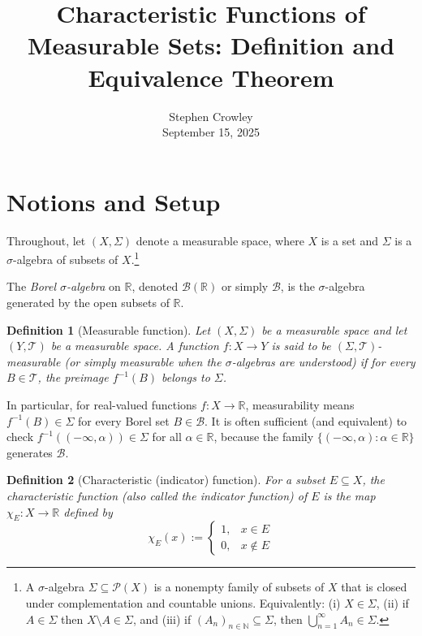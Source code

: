 \documentclass{article}
\newcommand{\assign}{:=}
\newcommand{\nin}{\not\in}
\newcommand{\tmaffiliation}[1]{\\ #1}
\newcommand{\tmem}[1]{{\em #1\/}}
\newtheorem{definition}{Definition}
{\theorembodyfont{\rmfamily}\newtheorem{remark}{Remark}}
\newcommand{\R}{\mathbb{R}}
\newcommand{\B}{\mathcal{B}}
\newcommand{\Sig}{\Sigma}
\begin{document}
\title{Characteristic Functions of Measurable Sets: Definition and Equivalence
Theorem}

\author{
  Stephen Crowley
  \tmaffiliation{September 15, 2025}
}

\date{}

\maketitle

\section*{Notions and Setup}

Throughout, let $(X, \Sig)$ denote a measurable space, where $X$ is a set and
$\Sig$ is a $\sigma$-algebra of subsets of $X$.\footnote{A $\sigma$-algebra
$\Sig \subseteq \mathcal{P} (X)$ is a nonempty family of subsets of $X$ that
is closed under complementation and countable unions. Equivalently: (i) $X \in
\Sig$, (ii) if $A \in \Sig$ then $X \setminus A \in \Sig$, and (iii) if
$(A_n)_{n \in \mathbb{N}} \subseteq \Sig$, then $\bigcup_{n = 1}^{\infty} A_n
\in \Sig$.}

The {\tmem{Borel $\sigma$-algebra}} on $\R$, denoted $\B (\R)$ or simply $\B$,
is the $\sigma$-algebra generated by the open subsets of $\R$.

\begin{definition}
  [Measurable function] Let $(X, \Sig)$ be a measurable space and let $(Y,
  \mathcal{T})$ be a measurable space. A function $f : X \to Y$ is said to be
  $(\Sig, \mathcal{T})${\tmem{-measurable}} (or simply {\tmem{measurable}}
  when the $\sigma$-algebras are understood) if for every $B \in \mathcal{T}$,
  the preimage $f^{- 1} (B)$ belongs to $\Sig$.
\end{definition}

In particular, for real-valued functions $f : X \to \R$, measurability means
$f^{- 1} (B) \in \Sig$ for every Borel set $B \in \B$. It is often sufficient
(and equivalent) to check $f^{- 1} ((- \infty, \alpha)) \in \Sig$ for all
$\alpha \in \R$, because the family $\{(- \infty, \alpha) : \alpha \in \R \}$
generates $\B$.

\begin{definition}
  [Characteristic (indicator) function] For a subset $E \subseteq X$, the
  {\tmem{characteristic function}} (also called the {\tmem{indicator
  function}}) of $E$ is the map $\chi_E : X \to \R$ defined by
  \begin{equation}
    \chi_E (x) \assign \left\{\begin{array}{ll}
      1, & x \in E\\
      0, & x \nin E
    \end{array}\right.
  \end{equation}
\end{definition}
\end{document}

